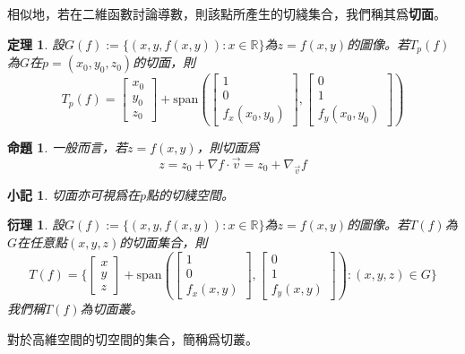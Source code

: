\documentclass[12pt]{article}
\newtheorem*{theorem}{定理}
\newtheorem*{corollary}{衍理}
\newtheorem*{proposition}{命題}
\newtheorem*{remark}{小記}
\begin{document}
    相似地，若在二維函數討論導數，則該點所產生的切綫集合，我們稱其爲\textbf{切面}。

    \begin{theorem}
        設$G(f):=\{(x,y,f(x,y)):x\in\mathbb{R}\}$為$z=f(x,y)$的圖像。若$T_p(f)$為$G$在$p=(x_0,y_0,z_0)$的切面，則$$T_p(f)=\begin{bmatrix}
            x_0\\y_0\\z_0
        \end{bmatrix}+\mathrm{span}(\begin{bmatrix}
            1\\0\\f_x(x_0,y_0)
        \end{bmatrix},\begin{bmatrix}
            0\\1\\f_y(x_0,y_0)
        \end{bmatrix})$$
    \end{theorem}

    \begin{proposition}
        一般而言，若$z=f(x,y)$，則切面爲$$z=z_0 + \nabla f \cdot \vec{v}= z_0 + \nabla_{\vec{v}}f$$
    \end{proposition}

    \begin{remark}
        切面亦可視爲在$p$點的切綫空間。
    \end{remark}

    \begin{corollary}
        設$G(f):=\{(x,y,f(x,y)):x\in\mathbb{R}\}$為$z=f(x,y)$的圖像。若$T(f)$為$G$在任意點$(x,y,z)$的切面集合，則$$T(f)=\{\begin{bmatrix}
            x\\y\\z
        \end{bmatrix}+\mathrm{span}(\begin{bmatrix}
            1\\0\\f_x(x,y)
        \end{bmatrix},\begin{bmatrix}
            0\\1\\f_y(x,y)
        \end{bmatrix}): (x,y,z)\in G\}$$
        我們稱$T(f)$為切面叢。
    \end{corollary}

    對於高維空間的切空間的集合，簡稱爲切叢。
\end{document}
